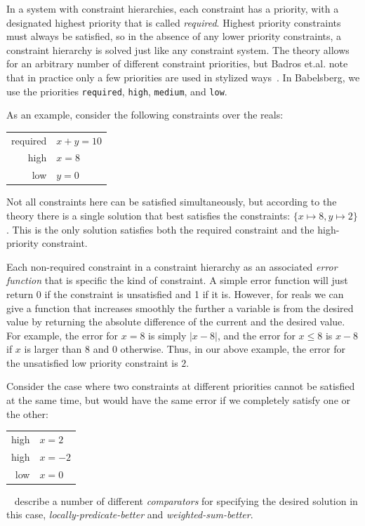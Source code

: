 In a system with constraint hierarchies, each constraint has a
priority, with a designated highest priority that is called
\emph{required}. Highest priority constraints must always be
satisfied, so in the absence of any lower priority constraints, a
constraint hierarchy is solved just like any constraint system. The
theory allows for an arbitrary number of different constraint
priorities, but Badros et.al. note that in practice only a few
priorities are used in stylized ways~\cite{badros2001cassowary}. In
Babelsberg, we use the priorities \lstinline{required},
\lstinline{high}, \lstinline{medium}, and \lstinline{low}.

As an example, consider the following constraints over the reals:
\begin{center}
\begin{tabular}{rl}
required &     $x+y=10$ \\
high     &     $x=8$ \\
low      &     $y=0$
\end{tabular}
\end{center}
Not all constraints here can be satisfied simultaneously, but
according to the theory there is a single solution that best satisfies
the constraints: $\{x \mapsto 8, y \mapsto 2\}$. This is the only
solution satisfies both the required constraint and the high-priority
constraint.

Each non-required constraint in a constraint hierarchy as an
associated \emph{error function} that is specific the kind of
constraint. A simple error function will just return 0 if the
constraint is unsatisfied and 1 if it is. However, for reals we can
give a function that increases smoothly the further a variable is from
the desired value by returning the absolute difference of the current
and the desired value. For example, the error for $x=8$ is simply
$|x-8|$, and the error for $x\leq8$ is $x-8$ if $x$ is larger than $8$
and $0$ otherwise. Thus, in our above example, the error for the
unsatisfied low priority constraint is $2$.

Consider the case where two constraints at different priorities cannot
be satisfied at the same time, but would have the same error if we
completely satisfy one or the other:
\begin{center}
\begin{tabular}{rl}
high     &     $x=2$ \\
high     &     $x=-2$ \\
low      &     $x=0$
\end{tabular}
\end{center}
\citeauthor{borning1992constraint}~\cite{borning1992constraint} describe a number of
different \emph{comparators} for specifying the desired solution in
this case, \emph{locally-predicate-better} and
\emph{weighted-sum-better}.

